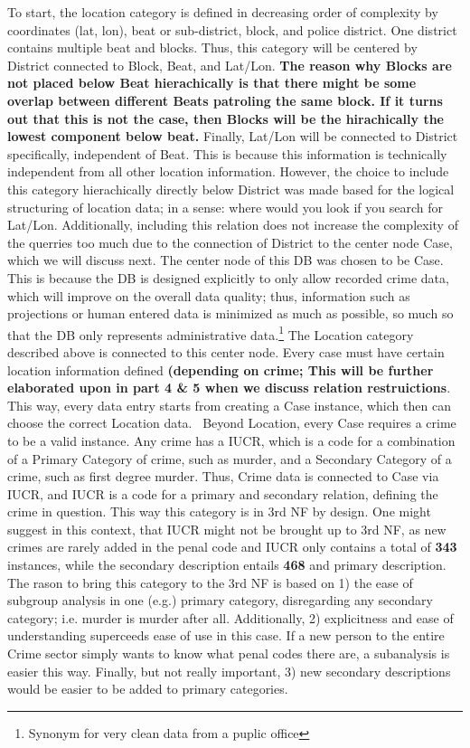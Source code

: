 \documentclass[a4paper]{article}
\begin{document}
To start, the location category is defined in decreasing order of complexity by coordinates (lat, lon), beat or sub-district, block, and police district. One district contains multiple beat and blocks.  Thus, this category will be centered by District connected to Block, Beat, and Lat/Lon. \textbf{The reason why Blocks are not placed below Beat hierachically is that there might be some overlap between different Beats patroling the same block. If it turns out that this is not the case, then Blocks will be the hirachically the lowest component below beat.} Finally, Lat/Lon will be connected to District specifically, independent of Beat. This is because this information is technically independent from all other location information. However, the choice to include this category hierachically directly below District was made based for the logical structuring of location data; in a sense: where would you look if you search for Lat/Lon. Additionally, including this relation does not increase the complexity of the querries too much due to the connection of District to the center node Case, which we will discuss next.
\indent The center node of this DB was chosen to be Case. This is because the DB is designed explicitly to only allow recorded crime data, which will improve on the overall data quality; thus, information such as projections or human entered data is minimized as much as possible, so much so that the DB only represents administrative data.\footnote{Synonym for very clean data from a puplic office} The Location category described above is connected to this center node. Every case must have certain location information defined \textbf{(depending on crime; This will be further elaborated upon in part 4 \& 5 when we discuss relation restruictions}. This way, every data entry starts from creating a Case instance, which then can choose the correct Location data. 
\ Beyond Location, every Case requires a crime to be a valid instance. Any crime has a IUCR, which is a code for a combination of a Primary Category of crime, such as murder, and a Secondary Category of a crime, such as first degree murder. Thus, Crime data is connected to Case via IUCR, and IUCR is a code for a primary and secondary relation, defining the crime in question. This way this category is in 3rd NF by design. One might suggest in this context, that IUCR might not be brought up to 3rd NF, as new crimes are rarely added in the penal code and IUCR only contains a total of \textbf{343} instances, while the secondary description entails \textbf{468} and primary description. The rason to bring this category to the 3rd NF is based on 1) the ease of subgroup analysis in one (e.g.) primary category, disregarding any secondary category; i.e. murder is murder after all. Additionally, 2) explicitness and ease of understanding superceeds ease of use in this case. If a new person to the entire Crime sector simply wants to know what penal codes there are, a subanalysis is easier this way. Finally, but not really important, 3) new secondary descriptions would be easier to be added to primary categories.
\end{document}
